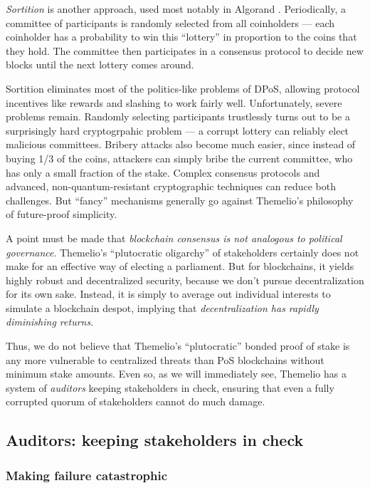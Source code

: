 \documentclass[letterpaper,12pt,oneside]{article}
\begin{document}
\textit{Sortition} is another approach, used most notably in Algorand \cite{gilad2017algorand}. Periodically, a committee of participants is randomly selected from all coinholders --- each coinholder has a probability to win this ``lottery'' in proportion to the coins that they hold. The committee then participates in a consensus protocol to decide new blocks until the next lottery comes around.

Sortition eliminates most of the politics-like problems of DPoS, allowing protocol incentives like rewards and slashing to work fairly well. Unfortunately, severe problems remain. Randomly selecting participants trustlessly turns out to be a surprisingly hard cryptogrpahic problem --- a corrupt lottery can reliably elect malicious committees. Bribery attacks also become much easier, since instead of buying 1/3 of the coins, attackers can simply bribe the current committee, who has only a small fraction of the stake. Complex consensus protocols and advanced, non-quantum-resistant cryptographic techniques can reduce both challenges. But ``fancy'' mechanisms generally go against Themelio's philosophy of future-proof simplicity.

A point must be made that \textit{blockchain consensus is not analogous to political governance}. Themelio's ``plutocratic oligarchy'' of stakeholders certainly does not make for an effective way of electing a parliament. But for blockchains, it yields highly robust and decentralized security, because we don't pursue decentralization for its own sake. Instead, it is simply to average out individual interests to simulate a blockchain despot, implying that \emph{decentralization has rapidly diminishing returns}.

Thus, we do not believe that Themelio's ``plutocratic'' bonded proof of stake is any more vulnerable to centralized threats than PoS blockchains without minimum stake amounts. Even so, as we will immediately see, Themelio has a system of \textit{auditors} keeping stakeholders in check, ensuring that even a fully corrupted quorum of stakeholders cannot do much damage.

\subsection{Auditors: keeping stakeholders in check}

\subsubsection{Making failure catastrophic} \label{sec:nuke}
\end{document}
